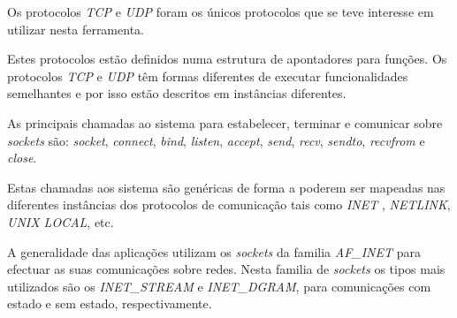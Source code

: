 





Os protocolos \textit{TCP} e \textit{UDP} foram os únicos protocolos que se teve interesse em utilizar nesta ferramenta.

Estes protocolos estão definidos numa estrutura de apontadores para funções.
Os protocolos \textit{TCP} e \textit{UDP} têm formas diferentes de executar funcionalidades semelhantes e por isso estão descritos em instâncias diferentes.

As principais chamadas ao sistema para estabelecer, terminar e comunicar sobre \textit{sockets} são: \textit{socket}, \textit{connect}, \textit{bind}, \textit{listen}, \textit{accept}, \textit{send}, \textit{recv}, \textit{sendto}, \textit{recvfrom} e \textit{close}. 

Estas chamadas aos sistema são genéricas de forma a poderem ser mapeadas nas diferentes instâncias dos protocolos de comunicação tais como \textit{INET} , \textit{NETLINK}, \textit{UNIX LOCAL}, etc.


 A generalidade das aplicações utilizam os \textit{sockets} da familia \textit{AF\_INET} para efectuar as suas comunicações sobre redes.
 Nesta familia de \textit{sockets} os tipos mais utilizados são os \textit{INET\_STREAM} e \textit{INET\_DGRAM}, para comunicações com estado e sem estado, respectivamente.





